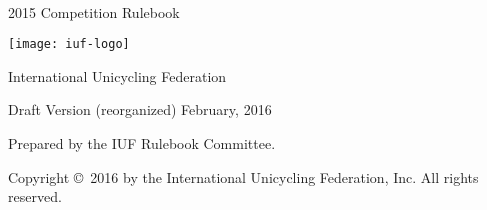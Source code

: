 \begin{titlepage}
\centering
\ \\
\vspace{5cm}
{\Huge 2015 Competition Rulebook}
\vspace{5mm}

\texttt{[image: iuf-logo]}

\vspace{5mm}
{\huge International Unicycling Federation}

\vspace{5mm}
{\Large Draft Version (reorganized) \quad February, 2016}

\vspace{50mm}
Prepared by the IUF Rulebook Committee.

\vspace{5mm}
{\small Copyright \copyright\ 2016 by the International Unicycling Federation, Inc. All rights reserved.}

\end{titlepage}
